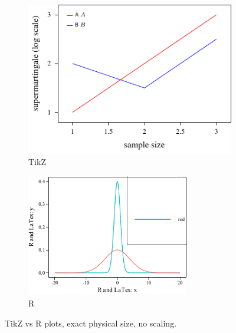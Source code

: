 \documentclass[preprint,aos]{imsart}
\begin{document}
\begin{figure}[htb]
    \centering
    \begin{subfigure}[t]{2.8in}
        \includegraphics{scatterplot-tikz.pdf}
        \caption{TikZ}
    \end{subfigure}\hfill
    \begin{subfigure}[t]{2.8in}
        \includegraphics[width=2.8in]{scatterplot-R.pdf}
        \caption{R}
    \end{subfigure}

    \caption{TikZ vs R plots, exact physical size, no scaling.}
\end{figure}
\end{document}
